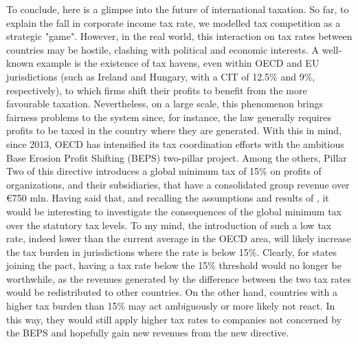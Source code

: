 To conclude, here is a glimpse into the future of international taxation. So far, to explain the fall in corporate income tax rate, we modelled tax competition as a strategic "game". However, in the real world, this interaction on tax rates between countries may be hostile, clashing with political and economic interests. A well-known example is the existence of tax havens, even within OECD and EU jurisdictions (such as Ireland and Hungary, with a CIT of 12.5\% and 9\%, respectively), to which firms shift their profits to benefit from the more favourable taxation. Nevertheless, on a large scale, this phenomenon brings fairness problems to the system since, for instance, the law generally requires profits to be taxed in the country where they are generated. With this in mind, since 2013, OECD has intensified its tax coordination efforts with the ambitious Base Erosion Profit Shifting (BEPS) two-pillar project. Among the others, Pillar Two of this directive introduces a global minimum tax of 15\% on profits of organizations, and their subsidiaries, that have a consolidated group revenue over €750 mln. Having said that,  and recalling the assumptions and results of \textcite{dev-loc-red-08}, it would be interesting to investigate the consequences of the global minimum tax over the statutory tax levels. To my mind, the introduction of such a low tax rate, indeed lower than the current average in the OECD area, will likely increase the tax burden in jurisdictions where the rate is below 15\%. Clearly, for states joining the pact, having a tax rate below the 15\% threshold would no longer be worthwhile, as the revenues generated by the difference between the two tax rates would be redistributed to other countries. On the other hand, countries with a higher tax burden than 15\% may act ambiguously or more likely not react. In this way, they would still apply higher tax rates to companies not concerned by the BEPS and hopefully gain new revenues from the new directive.